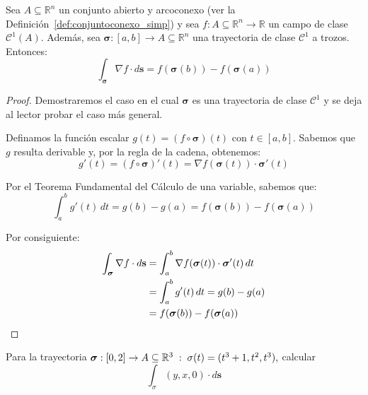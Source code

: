 \begin{theorem} \label{thm:t1} 
Sea $A \subseteq \mathbb{R}^n$ un conjunto abierto y arcoconexo (ver la Definición~\ref{def:conjuntoconexo_simp}) y sea $f: A \subseteq \mathbb{R}^n \to \mathbb{R}$ un campo de clase $\mathcal{C}^1(A)$. Además, sea $\boldsymbol{\sigma}: [a,b] \to A \subseteq \mathbb{R}^n$ una trayectoria de clase $\mathcal{C}^{1}$ a trozos. Entonces: 
\[ \int_{\boldsymbol{\sigma}} \nabla f \cdot d\mathbf{s} = f(\boldsymbol{\sigma}(b)) - f(\boldsymbol{\sigma}(a)) \] 
\end{theorem}

\begin{proof}
Demostraremos el caso en el cual $\boldsymbol{\sigma}$ es una trayectoria de clase $\mathcal{C}^{1}$ y se deja al lector probar el caso más general. 

Definamos la función escalar $g(t) = (f \circ \boldsymbol{\sigma})(t)$ con $t \in [a,b]$. Sabemos que $g$ resulta derivable y, por la regla de la cadena, obtenemos: 
\begin{equation*} 
g'(t) = (f \circ \boldsymbol{\sigma})'(t) = \nabla f(\boldsymbol{\sigma}(t)) \cdot \boldsymbol{\sigma}'(t) 
\end{equation*} 

Por el Teorema Fundamental del Cálculo de una variable, sabemos que: 
\begin{equation*} 
\int_{a}^{b} g'(t) \, dt = g(b) - g(a) = f(\boldsymbol{\sigma}(b)) - f(\boldsymbol{\sigma}(a)) 
\end{equation*} 

Por consiguiente:
\begin{align*} 
\int_{\boldsymbol{\sigma}} \nabla f \cdot d\mathbf{s} &= \int_{a}^{b} \nabla f(\boldsymbol{\sigma}(t)) \cdot \boldsymbol{\sigma}'(t) \, dt \\ 
&= \int_{a}^{b} g'(t) \, dt = g(b) - g(a) \\ 
&= f(\boldsymbol{\sigma}(b)) - f(\boldsymbol{\sigma}(a))   \qedhere
\end{align*} 
\end{proof}



\begin{tarea} Para la trayectoria  $\boldsymbol{\sigma}:[0,2]\to A\subseteq\mathbb{R}^3\; : \; \sigma(t) = (t^{3}+1, t^{2}, t^{3}),$  calcular  $$ \int_{\sigma}  (y, x, 0)  \cdot d\mathbf{s} $$
\end{tarea}


